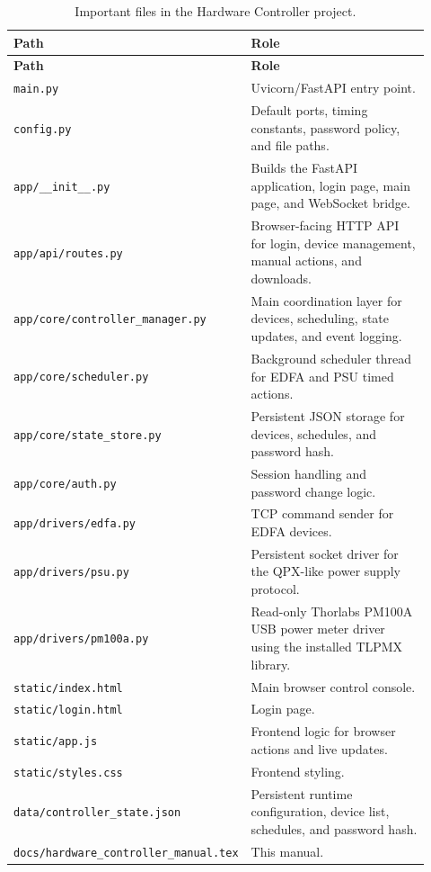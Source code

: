 \documentclass[11pt,a4paper]{article}
\begin{document}
\begin{longtable}{>{\raggedright\arraybackslash}p{0.31\linewidth} >{\raggedright\arraybackslash}p{0.61\linewidth}}
\caption{Important files in the Hardware Controller project.}\label{tab:layout}\\
\toprule
\textbf{Path} & \textbf{Role} \\
\midrule
\endfirsthead
\toprule
\textbf{Path} & \textbf{Role} \\
\midrule
\endhead
\texttt{main.py} & Uvicorn/FastAPI entry point. \\
\texttt{config.py} & Default ports, timing constants, password policy, and file paths. \\
\texttt{app/\_\_init\_\_.py} & Builds the FastAPI application, login page, main page, and WebSocket bridge. \\
\texttt{app/api/routes.py} & Browser-facing HTTP API for login, device management, manual actions, and downloads. \\
\texttt{app/core/controller\_manager.py} & Main coordination layer for devices, scheduling, state updates, and event logging. \\
\texttt{app/core/scheduler.py} & Background scheduler thread for EDFA and PSU timed actions. \\
\texttt{app/core/state\_store.py} & Persistent JSON storage for devices, schedules, and password hash. \\
\texttt{app/core/auth.py} & Session handling and password change logic. \\
\texttt{app/drivers/edfa.py} & TCP command sender for EDFA devices. \\
\texttt{app/drivers/psu.py} & Persistent socket driver for the QPX-like power supply protocol. \\
\texttt{app/drivers/pm100a.py} & Read-only Thorlabs PM100A USB power meter driver using the installed TLPMX library. \\
\texttt{static/index.html} & Main browser control console. \\
\texttt{static/login.html} & Login page. \\
\texttt{static/app.js} & Frontend logic for browser actions and live updates. \\
\texttt{static/styles.css} & Frontend styling. \\
\texttt{data/controller\_state.json} & Persistent runtime configuration, device list, schedules, and password hash. \\
\texttt{docs/hardware\_controller\_manual.tex} & This manual. \\
\bottomrule
\end{longtable}
\end{document}
